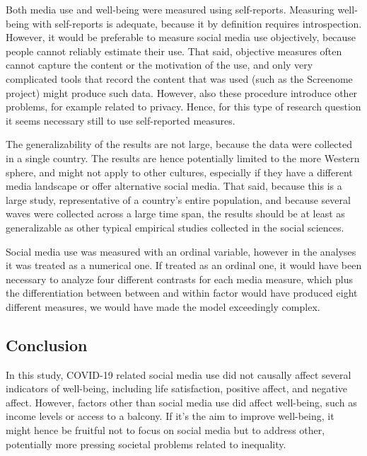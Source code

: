 \documentclass[
  english,
  man,mask,floatsintext]{apa6}
\begin{document}
Both media use and well-being were measured using self-reports.
Measuring well-being with self-reports is adequate, because it by definition requires introspection.
However, it would be preferable to measure social media use objectively, because people cannot reliably estimate their use.
That said, objective measures often cannot capture the content or the motivation of the use, and only very complicated tools that record the content that was used (such as the Screenome project) might produce such data.
However, also these procedure introduce other problems, for example related to privacy.
Hence, for this type of research question it seems necessary still to use self-reported measures.

The generalizability of the results are not large, because the data were collected in a single country.
The results are hence potentially limited to the more Western sphere, and might not apply to other cultures, especially if they have a different media landscape or offer alternative social media.
That said, because this is a large study, representative of a country's entire population, and because several waves were collected across a large time span, the results should be at least as generalizable as other typical empirical studies collected in the social sciences.

Social media use was measured with an ordinal variable, however in the analyses it was treated as a numerical one.
If treated as an ordinal one, it would have been necessary to analyze four different contrasts for each media measure, which plus the differentiation between between and within factor would have produced eight different measures, we would have made the model exceedingly complex.

\hypertarget{conclusion}{%
\subsection{Conclusion}\label{conclusion}}

In this study, COVID-19 related social media use did not causally affect several indicators of well-being, including life satisfaction, positive affect, and negative affect.
However, factors other than social media use did affect well-being, such as income levels or access to a balcony.
If it's the aim to improve well-being, it might hence be fruitful not to focus on social media but to address other, potentially more pressing societal problems related to inequality.

\newpage
\end{document}
